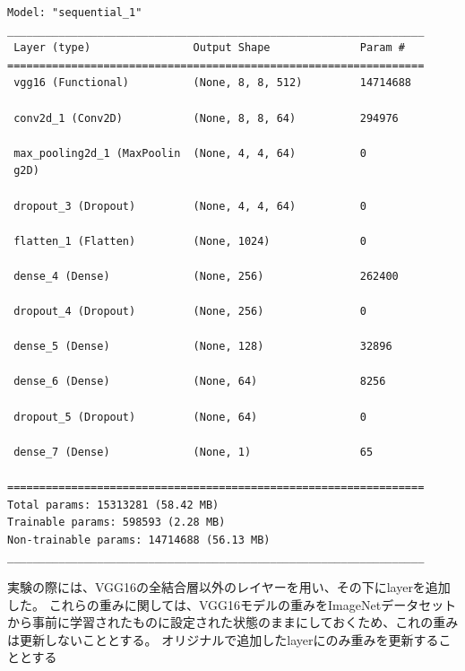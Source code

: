 \documentclass[a4paper, 11pt, titlepage]{jsarticle}
\begin{document}
{\fontsize{10pt}{9pt}\selectfont
\begin{verbatim}
Model: "sequential_1"
_________________________________________________________________
 Layer (type)                Output Shape              Param #   
=================================================================
 vgg16 (Functional)          (None, 8, 8, 512)         14714688  
                                                                 
 conv2d_1 (Conv2D)           (None, 8, 8, 64)          294976    
                                                                 
 max_pooling2d_1 (MaxPoolin  (None, 4, 4, 64)          0         
 g2D)                                                            
                                                                 
 dropout_3 (Dropout)         (None, 4, 4, 64)          0         
                                                                 
 flatten_1 (Flatten)         (None, 1024)              0         
                                                                 
 dense_4 (Dense)             (None, 256)               262400    
                                                                 
 dropout_4 (Dropout)         (None, 256)               0         
                                                                 
 dense_5 (Dense)             (None, 128)               32896     
                                                                 
 dense_6 (Dense)             (None, 64)                8256      
                                                                 
 dropout_5 (Dropout)         (None, 64)                0         
                                                                 
 dense_7 (Dense)             (None, 1)                 65        
                                                                 
=================================================================
Total params: 15313281 (58.42 MB)
Trainable params: 598593 (2.28 MB)
Non-trainable params: 14714688 (56.13 MB)
_________________________________________________________________
\end{verbatim}
}\par
実験の際には、VGG16の全結合層以外のレイヤーを用い、その下にlayerを追加した。
これらの重みに関しては、VGG16モデルの重みをImageNetデータセットから事前に学習されたものに設定された状態のままにしておくため、これの重みは更新しないこととする。
オリジナルで追加したlayerにのみ重みを更新することとする
\end{document}
